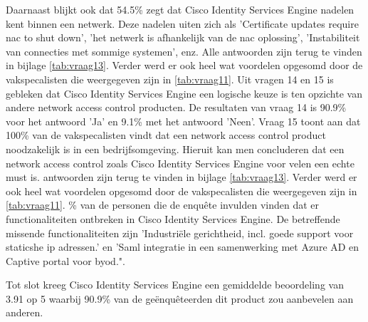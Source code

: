Daarnaast blijkt ook dat 54.5\% zegt dat Cisco Identity Services Engine nadelen kent binnen een netwerk. Deze nadelen uiten zich als 'Certificate updates require nac to shut down', 'het netwerk is afhankelijk van de nac oplossing', 'Instabiliteit van connecties met sommige systemen', enz. Alle antwoorden zijn terug te vinden in bijlage \ref{tab:vraag13}. Verder werd er ook heel wat voordelen opgesomd door de vakspecalisten die weergegeven zijn in \ref{tab:vraag11}.
\newline
\newline
Uit vragen 14 en 15 is gebleken dat Cisco Identity Services Engine een logische keuze is ten opzichte van andere network access control producten. De resultaten van vraag 14 is 90.9\% voor het antwoord 'Ja' en 9.1\% met het antwoord 'Neen'. Vraag 15 toont aan dat 100\% van de vakspecalisten vindt dat een network access control product noodzakelijk is in een bedrijfsomgeving. Hieruit kan men concluderen dat een network access control zoals Cisco Identity Services Engine voor velen een echte must is.
antwoorden zijn terug te vinden in bijlage \ref{tab:vraag13}. Verder werd er ook heel wat voordelen opgesomd door de vakspecalisten die weergegeven zijn in \ref{tab:vraag11}.
\newline
{}\% van de personen die de enquête invulden vinden dat er functionaliteiten ontbreken in Cisco Identity Services Engine. De betreffende missende functionaliteiten zijn 'Industriële gerichtheid, incl. goede support voor staticshe ip adressen.' en 'Saml integratie in een samenwerking met Azure AD en Captive portal voor byod.".


Tot slot kreeg Cisco Identity Services Engine een gemiddelde beoordeling van 3.91 op 5 waarbij 90.9\% van de geënquêteerden dit product zou aanbevelen aan anderen.





